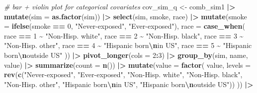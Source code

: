 \documentclass[12pt, twoside]{amherstthesis}
\newenvironment{Shaded}{\begin{snugshade}}{\end{snugshade}}
\newcommand{\AttributeTok}[1]{\textcolor[rgb]{0.13,0.29,0.53}{#1}}
\newcommand{\CommentTok}[1]{\textcolor[rgb]{0.56,0.35,0.01}{\textit{#1}}}
\newcommand{\DecValTok}[1]{\textcolor[rgb]{0.00,0.00,0.81}{#1}}
\newcommand{\FunctionTok}[1]{\textcolor[rgb]{0.13,0.29,0.53}{\textbf{#1}}}
\newcommand{\NormalTok}[1]{#1}
\newcommand{\OtherTok}[1]{\textcolor[rgb]{0.56,0.35,0.01}{#1}}
\newcommand{\SpecialCharTok}[1]{\textcolor[rgb]{0.81,0.36,0.00}{\textbf{#1}}}
\newcommand{\StringTok}[1]{\textcolor[rgb]{0.31,0.60,0.02}{#1}}
\begin{document}
\begin{Shaded}
\begin{Highlighting}[]
\CommentTok{\# bar + violin plot for categorical covariates}
\NormalTok{cov\_sim\_q }\OtherTok{\textless{}{-}}\NormalTok{ comb\_sim1 }\SpecialCharTok{|\textgreater{}} 
  \FunctionTok{mutate}\NormalTok{(}\AttributeTok{sim =} \FunctionTok{as.factor}\NormalTok{(sim)) }\SpecialCharTok{|\textgreater{}} 
  \FunctionTok{select}\NormalTok{(sim, smoke, race) }\SpecialCharTok{|\textgreater{}} 
  \FunctionTok{mutate}\NormalTok{(}\AttributeTok{smoke =} \FunctionTok{ifelse}\NormalTok{(smoke }\SpecialCharTok{==} \DecValTok{0}\NormalTok{, }\StringTok{"Never{-}exposed"}\NormalTok{, }\StringTok{"Ever{-}exposed"}\NormalTok{), }
         \AttributeTok{race =} \FunctionTok{case\_when}\NormalTok{(}
\NormalTok{           race }\SpecialCharTok{==} \DecValTok{1} \SpecialCharTok{\textasciitilde{}} \StringTok{"Non{-}Hisp. white"}\NormalTok{, }
\NormalTok{           race }\SpecialCharTok{==} \DecValTok{2} \SpecialCharTok{\textasciitilde{}} \StringTok{"Non{-}Hisp. black"}\NormalTok{, }
\NormalTok{           race }\SpecialCharTok{==} \DecValTok{3} \SpecialCharTok{\textasciitilde{}} \StringTok{"Non{-}Hisp. other"}\NormalTok{, }
\NormalTok{           race }\SpecialCharTok{==} \DecValTok{4} \SpecialCharTok{\textasciitilde{}} \StringTok{"Hispanic born}\SpecialCharTok{\textbackslash{}n}\StringTok{in US"}\NormalTok{, }
\NormalTok{           race }\SpecialCharTok{==} \DecValTok{5} \SpecialCharTok{\textasciitilde{}} \StringTok{"Hispanic born}\SpecialCharTok{\textbackslash{}n}\StringTok{outside US"}
\NormalTok{         )) }\SpecialCharTok{|\textgreater{}} 
  \FunctionTok{pivot\_longer}\NormalTok{(}\AttributeTok{cols =} \DecValTok{2}\SpecialCharTok{:}\DecValTok{3}\NormalTok{) }\SpecialCharTok{|\textgreater{}} 
  \FunctionTok{group\_by}\NormalTok{(sim, name, value) }\SpecialCharTok{|\textgreater{}} 
  \FunctionTok{summarize}\NormalTok{(}\AttributeTok{count =} \FunctionTok{n}\NormalTok{()) }\SpecialCharTok{|\textgreater{}} 
  \FunctionTok{mutate}\NormalTok{(}\AttributeTok{value =} \FunctionTok{factor}\NormalTok{(}
\NormalTok{    value, }\AttributeTok{levels =} \FunctionTok{rev}\NormalTok{(}\FunctionTok{c}\NormalTok{(}\StringTok{"Never{-}exposed"}\NormalTok{, }\StringTok{"Ever{-}exposed"}\NormalTok{,}
                          \StringTok{"Non{-}Hisp. white"}\NormalTok{, }\StringTok{"Non{-}Hisp. black"}\NormalTok{, }\StringTok{"Non{-}Hisp. other"}\NormalTok{, }
                          \StringTok{"Hispanic born}\SpecialCharTok{\textbackslash{}n}\StringTok{in US"}\NormalTok{, }\StringTok{"Hispanic born}\SpecialCharTok{\textbackslash{}n}\StringTok{outside US"}\NormalTok{))}
\NormalTok{  )) }\SpecialCharTok{|\textgreater{}} 

\end{Highlighting}
\end{Shaded}
\end{document}
